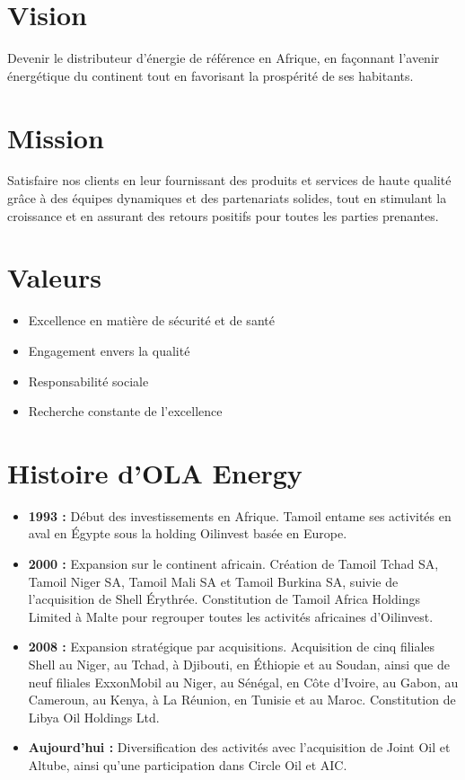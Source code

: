 \documentclass[a4paper, oneside, 12pt, final]{extreport}
\begin{document}
\section{Vision}

Devenir le distributeur d’énergie de référence en Afrique, en façonnant l'avenir énergétique du continent tout en favorisant la prospérité de ses habitants.

\section{Mission}

Satisfaire nos clients en leur fournissant des produits et services de haute qualité grâce à des équipes dynamiques et des partenariats solides, tout en stimulant la croissance et en assurant des retours positifs pour toutes les parties prenantes.

\section{Valeurs}
\begin{itemize}


\item Excellence en matière de sécurité et de santé
\item Engagement envers la qualité
\item Responsabilité sociale
\item Recherche constante de l'excellence
\end{itemize}
\section{Histoire d'OLA Energy}
\begin{itemize}
\item \textbf{1993 :} Début des investissements en Afrique. Tamoil entame ses activités en aval en Égypte sous la holding Oilinvest basée en Europe.
\item \textbf{2000 :} Expansion sur le continent africain. Création de Tamoil Tchad SA, Tamoil Niger SA, Tamoil Mali SA et Tamoil Burkina SA, suivie de l'acquisition de Shell Érythrée. Constitution de Tamoil Africa Holdings Limited à Malte pour regrouper toutes les activités africaines d'Oilinvest.
\item \textbf{2008 :} Expansion stratégique par acquisitions. Acquisition de cinq filiales Shell au Niger, au Tchad, à Djibouti, en Éthiopie et au Soudan, ainsi que de neuf filiales ExxonMobil au Niger, au Sénégal, en Côte d'Ivoire, au Gabon, au Cameroun, au Kenya, à La Réunion, en Tunisie et au Maroc. Constitution de Libya Oil Holdings Ltd.
\item \textbf{Aujourd'hui :} Diversification des activités avec l'acquisition de Joint Oil et Altube, ainsi qu'une participation dans Circle Oil et AIC.
\end{itemize}
\end{document}
